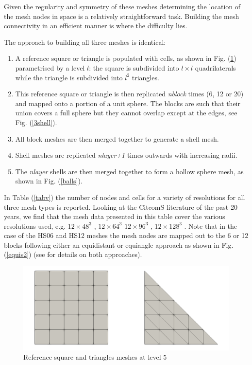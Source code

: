 \documentclass[a4paper]{article}
\begin{document}
Given the regularity and symmetry of these meshes determining the location of the 
mesh nodes in space is a relatively straightforward task. Building the mesh connectivity in an 
efficient manner is where the difficulty lies.

The approach to building all three meshes is identical:
\begin{enumerate}
\item A reference square or triangle is populated with cells, as shown in Fig. (\ref{basics}) 
parametrised by a level $l$: the square is subdivided into $l\times l$ quadrilaterals while 
the triangle is subdivided into $l^2$ triangles.

\item This reference square or triangle is then replicated {\sl nblock} times (6, 12 or 20) and mapped
onto a portion of a unit sphere. The blocks are such that their union covers a full sphere
but they cannot overlap except at the edges, see Fig. (\ref{3shell}).

\item All block meshes are then merged together to generate a shell mesh. 
\item Shell meshes are replicated {\sl nlayer+1} times outwards with increasing radii. 
\item The {\sl nlayer} shells are then merged together to form a hollow sphere mesh, as shown in 
Fig. (\ref{balls}).
\end{enumerate}

In Table (\ref{tabv}) the number of nodes and cells for a variety of resolutions 
for all three mesh types is reported. Looking at the CitcomS literature of the past 20 years, we find that 
the mesh data presented in this table cover the various resolutions used, e.g.
$12\times48^3$ \cite{mczh04,arfw14}, $12\times64^3$ \cite{budt14}
$12\times96^3$ \cite{bumb10}, $12\times128^3$ \cite{beck06,wele16,welm16}.
Note that in the case of the HS06 and HS12 meshes the mesh nodes are mapped out to the 6 or 12 blocks 
following either an equidistant or equiangle approach as shown in Fig. (\ref{equis2}) (see \cite{puli07}
for details on both approaches). 

\begin{figure}[t]
\centering
\includegraphics[width=12cm]{images/basic_shapes/basics.png}
\caption{Reference square and triangles meshes at level 5 \label{basics}}
\end{figure}
\end{document}
